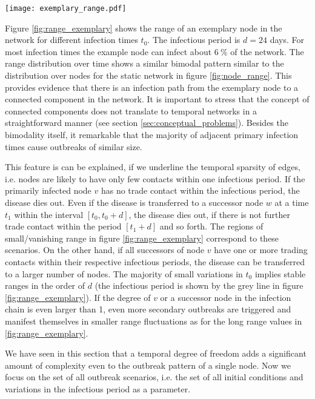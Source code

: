 \begin{SCfigure}
\texttt{[image: exemplary\_range.pdf]}
\caption{Temporal variation in the range $r(v,d,t_0)$ of an exemplary node $v$ in the network over one year.
Although the range remains rather constant for most infection times, it vanishes for certain periods.
The grey interval corresponds to the fixed infectious period $d=24$~days.
}
\label{fig:range_exemplary}
\end{SCfigure}
%
Figure \ref{fig:range_exemplary} shows the range of an exemplary node in the network for different infection times $t_0$.
The infectious period is $d=24$ days.
For most infection times the example node can infect about $6~\%$ of the network.
The range distribution over time shows a similar bimodal pattern similar to the distribution over nodes for the static network in figure \ref{fig:node_range}.
This provides evidence that there is an infection path from the exemplary node to a connected component in the network.
It is important to stress that the concept of connected components does not translate to temporal networks in a straightforward manner (see section \ref{sec:conceptual_problems}).
Besides the bimodality itself, it remarkable that the majority of adjacent primary infection times cause outbreaks of similar size.

This feature is can be explained, if we underline the temporal sparsity of edges, i.e. nodes are likely to have only few contacts within one infectious period.
If the primarily infected node $v$ has no trade contact within the infectious period, the disease dies out.
Even if the disease is transferred to a successor node $w$ at a time $t_1$ within the interval $[t_0,t_0+d]$, the disease dies out, if there is not further trade contact within the period $[t_1+d]$ and so forth.
The regions of small/vanishing range in figure \ref{fig:range_exemplary} correspond to these scenarios.
On the other hand, if all successors of node $v$ have one or more trading contacts within their respective infectious periods, the disease can be transferred to a larger number of nodes.
The majority of small variations in $t_0$ implies stable ranges in the order of $d$ (the infectious period is shown by the grey line in figure \ref{fig:range_exemplary}).
If the degree of $v$ or a successor node in the infection chain is even larger than 1, even more secondary outbreaks are triggered and manifest themselves in smaller range fluctuations as for the long range values in \ref{fig:range_exemplary}.

We have seen in this section that a temporal degree of freedom adds a significant amount of complexity even to the outbreak pattern of a single node.
Now we focus on the set of all outbreak scenarios, i.e. the set of all initial conditions and variations in the infectious period as a parameter.
%
